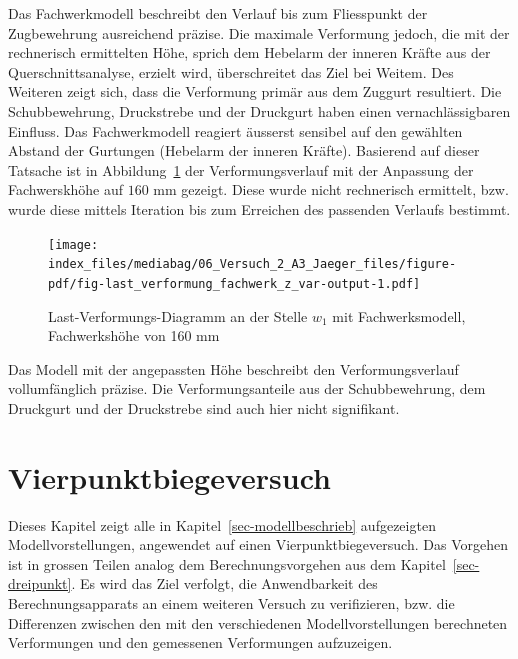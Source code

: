 \documentclass[
  12pt,
  letterpaper,
  egregdoesnotlikesansseriftitles]{scrreprt}
\begin{document}
Das Fachwerkmodell beschreibt den Verlauf bis zum Fliesspunkt der
Zugbewehrung ausreichend präzise. Die maximale Verformung jedoch, die
mit der rechnerisch ermittelten Höhe, sprich dem Hebelarm der inneren
Kräfte aus der Querschnittsanalyse, erzielt wird, überschreitet das Ziel
bei Weitem. Des Weiteren zeigt sich, dass die Verformung primär aus dem
Zuggurt resultiert. Die Schubbewehrung, Druckstrebe und der Druckgurt
haben einen vernachlässigbaren Einfluss. Das Fachwerkmodell reagiert
äusserst sensibel auf den gewählten Abstand der Gurtungen (Hebelarm der
inneren Kräfte). Basierend auf dieser Tatsache ist in
Abbildung~\ref{fig-last_verformung_fachwerk_z_var} der
Verformungsverlauf mit der Anpassung der Fachwerskhöhe auf
\(160\text{ mm}\) gezeigt. Diese wurde nicht rechnerisch ermittelt, bzw.
wurde diese mittels Iteration bis zum Erreichen des passenden Verlaufs
bestimmt.

\begin{figure}[H]

{\centering \texttt{[image: index\_files/mediabag/06\_Versuch\_2\_A3\_Jaeger\_files/figure-pdf/fig-last\_verformung\_fachwerk\_z\_var-output-1.pdf]}

}

\caption{\label{fig-last_verformung_fachwerk_z_var}Last-Verformungs-Diagramm
an der Stelle \(w_1\) mit Fachwerksmodell, Fachwerkshöhe von 160 mm}

\end{figure}

Das Modell mit der angepassten Höhe beschreibt den Verformungsverlauf
vollumfänglich präzise. Die Verformungsanteile aus der Schubbewehrung,
dem Druckgurt und der Druckstrebe sind auch hier nicht signifikant.


\hypertarget{sec-vierpunkt}{%
\chapter{Vierpunktbiegeversuch}\label{sec-vierpunkt}}

Dieses Kapitel zeigt alle in Kapitel~\ref{sec-modellbeschrieb}
aufgezeigten Modellvorstellungen, angewendet auf einen
Vierpunktbiegeversuch. Das Vorgehen ist in grossen Teilen analog dem
Berechnungsvorgehen aus dem Kapitel~\ref{sec-dreipunkt}. Es wird das
Ziel verfolgt, die Anwendbarkeit des Berechnungsapparats an einem
weiteren Versuch zu verifizieren, bzw. die Differenzen zwischen den mit
den verschiedenen Modellvorstellungen berechneten Verformungen und den
gemessenen Verformungen aufzuzeigen.
\end{document}
